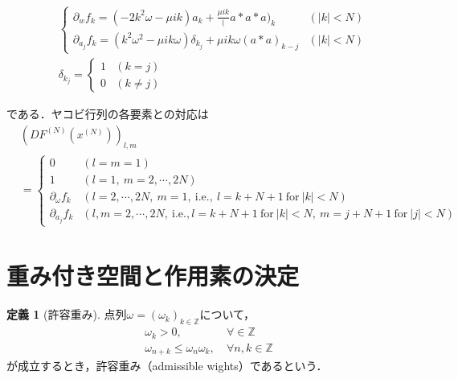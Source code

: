 \documentclass[11pt,a4paper,titlepage]{jsreport}
\theoremstyle{definition}
\newtheorem{dfn}{定義}
\begin{document}
\begin{align*}
   & \begin{cases}
       \partial_w f_k = (-2k^2\omega - \mu ik)a_k + \frac{\mu ik}(a*a*a)_k                     & (|k|<N) \\
       \partial_{a_j} f_k = (k^2\omega^2 - \mu ik\omega)\delta_{k_j} + \mu ik\omega(a*a)_{k-j} & (|k|<N)
     \end{cases}
  \\
   & \delta_{k_j} = \begin{cases}
                      1 & (k=j)     \\
                      0 & (k\neq j)
                    \end{cases}
\end{align*}

である．ヤコビ行列の各要素との対応は
\begin{align*}
   & \left(DF^{(N)}\left(x^{(N)}\right)\right)_{l,m}                                                                                        \\
   & = \begin{cases}
         0                   & \left(l=m=1\right)                                                                                             \\
         1                   & \left(l=1,\ m= 2,\cdots,2N\right)                                                                              \\
         \partial_\omega f_k & \left(l=2,\cdots,2N,\ m=1, \ \mathrm{i.e.},\ l=k+N+1 \ \mathrm{for} \ |k|<N\right)                             \\
         \partial_{a_j}f_k   & \left(l,m=2,\cdots,2N, \ \mathrm{i.e.}, l=k+N+1 \ \mathrm{for} \ |k|<N,\ m=j+N+1 \ \mathrm{for} \ |j|<N\right)
       \end{cases}
\end{align*}


\section{重み付き空間と作用素の決定}
\begin{dfn}[許容重み]
  点列$\omega = \left(\omega_k\right)_{k\in\mathbb{Z}}$について，
  \begin{align}
    \omega_k>0,\                           & \forall \in \mathbb{Z}   \\
    \omega_{n+k} \leq \omega_n \omega_k,\  & \forall n,k\in\mathbb{Z}
  \end{align}
  が成立するとき，許容重み（admissible wights）であるという．
\end{dfn}
\end{document}
